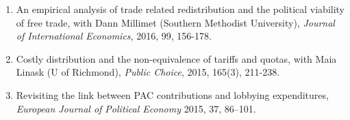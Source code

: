 \documentclass[11pt]{res}
\begin{document}
\begin{resume}
\begin{enumerate}
\item{An empirical analysis of trade related redistribution and the political viability of free trade}, with Dann Millimet (Southern Methodist University), \emph{Journal of International Economics}, 2016, 99, 156-178.
\item{Costly distribution and the non-equivalence of tariffs and quotas}, with Maia Linask (U of Richmond), \emph{Public Choice}, 2015, 165(3), 211-238.
\item{Revisiting the link between PAC contributions and lobbying expenditures, \emph{European Journal of Political Economy}} 2015, 37, 86--101.
\end{enumerate}

\end{resume}
\end{document}
